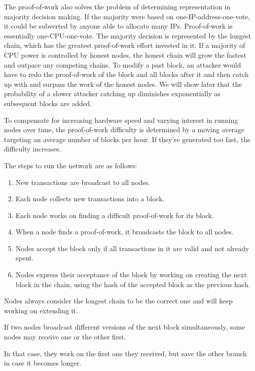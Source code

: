 \documentclass{article}
\begin{document}
The proof-of-work also solves the problem of determining representation in majority decision making. If the majority were based on one-IP-address-one-vote, it could be subverted by anyone able to allocate many IPs. Proof-of-work is essentially one-CPU-one-vote. The majority decision is represented by the longest chain, which has the greatest proof-of-work effort invested in it. If a majority of CPU power is controlled by honest nodes, the honest chain will grow the fastest and outpace any competing chains. To modify a past block, an attacker would have to redo the proof-of-work of the block and all blocks after it and then catch up with and surpass the work of the honest nodes. We will show later that the probability of a slower attacker catching up diminishes exponentially as subsequent blocks are added.

To compensate for increasing hardware speed and varying interest in running nodes over time, the proof-of-work difficulty is determined by a moving average targeting an average number of blocks per hour. If they're generated too fast, the difficulty increases.

The steps to run the network are as follows:

\begin{enumerate}
\item New transactions are broadcast to all nodes.
\item Each node collects new transactions into a block.
\item Each node works on finding a difficult proof-of-work for its block.
\item When a node finds a proof-of-work, it broadcasts the block to all nodes.
\item Nodes accept the block only if all transactions in it are valid and not already spent.
\item Nodes express their acceptance of the block by working on creating the next block in the chain, using the hash of the accepted block as the previous hash.
\end{enumerate}

Nodes always consider the longest chain to be the correct one and will keep working on extending it.

If two nodes broadcast different versions of the next block simultaneously, some nodes may receive one or the other first.

In that case, they work on the first one they received, but save the other branch in case it becomes longer.
\end{document}
